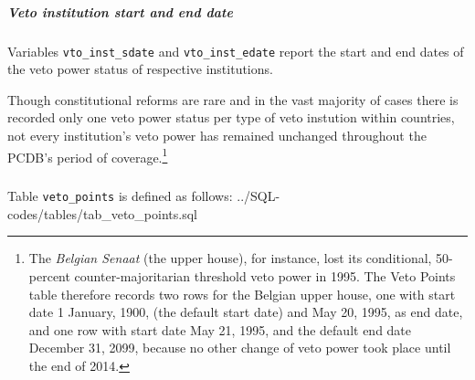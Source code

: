 \subparagraph{Veto institution start and end date}
Variables \texttt{vto\_inst\_sdate} and \texttt{vto\_inst\_edate} report the start and end dates of the veto power status of respective institutions.

Though constitutional reforms are rare and in the vast majority of cases there is recorded only one veto power status per type of veto instution within countries, not every institution's veto power has remained unchanged throughout the PCDB's period of coverage.\footnote{%
The {\em Belgian Senaat} (the upper house), for instance, lost its conditional, 50-percent counter-majoritarian threshold veto power in 1995. 
The Veto Points table therefore records two rows for the Belgian upper house, one with start date 1 January, 1900, (the default start date) and May 20, 1995, as end date, and one row with start date May 21, 1995, and the default end date December 31, 2099, because no other change of veto power took place until the end of 2014.}

\subparagraph{}
Table \texttt{veto\_points} is defined as follows: 
%
{../SQL-codes/tables/tab_veto_points.sql}


